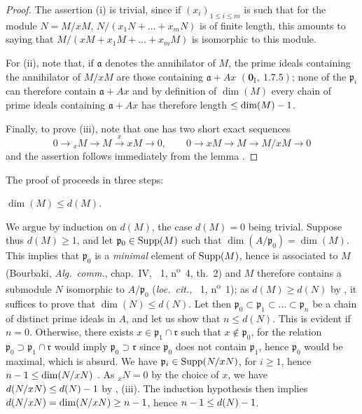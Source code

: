 \begin{proof}
The assertion (i) is trivial, since if $(x_i)_{1\leq i\leq m}$ is such that for the module $N=M/x M$, $N/(x_1N+\ldots+x_m N)$ is of finite length, this amounts to saying that $M/(x M+x_1M+\ldots+x_m M)$ is isomorphic to this module.

For (ii), note that, if $\mathfrak{a}$ denotes the annihilator of $M$, the prime ideals containing the annihilator of $M/x M$ are those containing $\mathfrak{a}+Ax$ $(\mathbf{0}_\mathrm{I},~1.7.5)$; none of the $\mathfrak{p}_i$ can therefore contain $\mathfrak{a}+Ax$ and by definition of $\dim(M)$  every chain of prime ideals containing $\mathfrak{a}+Ax$ has therefore length $\leq\dim(M)- 1$.


Finally, to prove (iii), note that one has two short exact sequences
\[
  0\to{}_x M\to M\xrightarrow{x}x M\to 0,\qquad 0\to x M\to M\to M/x M\to 0
\]
and the assertion follows immediately from the lemma .
\end{proof}

The proof of  proceeds in three steps:

\begin{env}[16.2.3.2]
\label{0.16.2.3.2}
$\dim(M)\leq d(M)$.
\end{env}

We argue by induction on $d(M)$, the case $d(M)=0$ being trivial.
Suppose thus $d(M)\geq 1$, and let $\mathfrak{p}_0\in\operatorname{Supp}(M)$ such that $\dim(A/\mathfrak{p}_0)=\dim(M)$.
This implies that $\mathfrak{p}_0$ is a \emph{minimal} element of $\operatorname{Supp}(M)$, hence is associated to $M$ (Bourbaki, \emph{Alg.~comm.}, chap.~IV, \textsection~1, n\textsuperscript{o}~4, th.~2) and $M$ therefore contains a submodule $N$ isomorphic to $A/\mathfrak{p}_0$ (\emph{loc.~cit.}, \textsection~1, n\textsuperscript{o}~1); as $d(M)\geq d(N)$ by , it suffices to prove that $\dim(N)\leq d(N)$.
Let then $\mathfrak{p}_0\subset\mathfrak{p}_1\subset\ldots\subset\mathfrak{p}_n$ be a chain of distinct prime ideals in $A$, and let us show that $n\leq d(N)$.
This is evident if $n=0$.
Otherwise, there exists $x\in\mathfrak{p}_1\cap\mathfrak{r}$ such that $x\notin\mathfrak{p}_0$, for the relation $\mathfrak{p}_0\supset\mathfrak{p}_1\cap\mathfrak{r}$ would imply $\mathfrak{p}_0\supset\mathfrak{r}$ since $\mathfrak{p}_0$ does not contain $\mathfrak{p}_1$, hence $\mathfrak{p}_0$ would be maximal, which is absurd.
We have $\mathfrak{p}_i\in\operatorname{Supp}(N/x N)$, for $i\geq 1$, hence $n- 1\leq\dim(N/x N)$ .
As ${}_x N=0$ by the choice of $x$, we have $d(N/x N)\leq d(N)- 1$ by , (iii).
The induction hypothesis then implies $d(N/x N)=\dim(N/x N)\geq n- 1$, hence $n- 1\leq d(N)- 1$.


